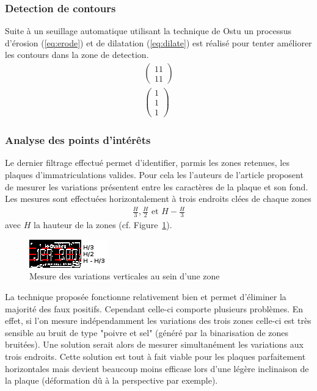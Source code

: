 \documentclass[a4paper,10pt,twocolumn]{article}
\begin{document}
\subsubsection{Detection de contours}
Suite à un seuillage automatique utilisant la technique de Ostu\cite{otsu79} un processus d'érosion (\ref{eq:erode}) et de dilatation (\ref{eq:dilate}) est réalisé pour tenter améliorer les contours dans la zone de detection.
\begin{gather}
  \label{eq:erode}
  \left( \begin{array}{c} 
    1 1\\
    1 1
  \end{array} \right)\\
  \label{eq:dilate}
  \left( \begin{array}{c} 
    1\\
    1\\
    1 
  \end{array} \right)
\end{gather}

\subsubsection{Analyse des points d'intérêts}
Le dernier filtrage effectué permet d'identifier, parmis les zones retenues, les plaques d'immatriculations valides. Pour cela les l'auteurs de l'article proposent de mesurer les variations présentent entre les caractères de la plaque et son fond. Les mesures sont effectuées horizontalement à trois endroits clées de chaque zones
\begin{align*}
  \frac{H}{3}, \frac{H}{2}\text{ et }H - \frac{H}{3}
\end{align*}
avec $H$ la hauteur de la zones (cf. Figure~\ref{plate_bin}).
\begin{figure}[H]
	\centering 
	  \includegraphics{img/plate_bin.png}
	\caption{Mesure des variations verticales au sein d'une zone\label{plate_bin}}
\end{figure}
La technique proposée fonctionne relativement bien et permet d'éliminer la majorité des faux positifs. Cependant celle-ci comporte plusieurs problèmes. En effet, si l'on mesure indépendamment les variations des trois zones celle-ci est très sensible au bruit de type "poivre et sel" (généré par la binarisation de zones bruitées). Une solution serait alors de mesurer simultanément les variations aux trois endroits. Cette solution est tout à fait viable pour les plaques parfaitement horizontales mais devient beaucoup moins efficase lors d'une légère inclinaison de la plaque (déformation dû à la perspective par exemple). 
\end{document}
